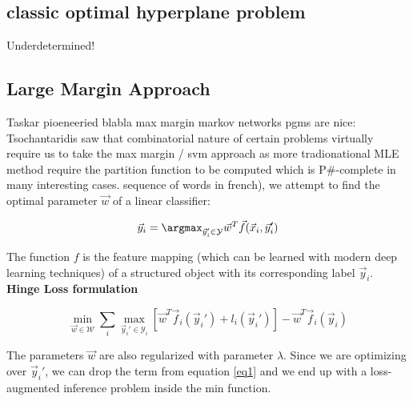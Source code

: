 \subsection{classic optimal hyperplane problem}
Underdetermined!



\clearpage
\subsection{Large Margin Approach}
Taskar pioeneeried blabla max margin markov networks pgms are nice: \cite{taskarMaxMarginMarkovNetworks2004}
Tsochantaridis saw that combinatorial nature of certain problems virtually
require us to take the max margin / svm approach as more tradionational MLE
method require the partition function to be computed which is P\#-complete in
many interesting cases.\cite{tsochantaridisSupportVectorMachine}
 sequence of words in
french), we attempt to find the optimal parameter $\vec w$ of a linear classifier:

\begin{equation}
  \vec y_i = \argmax_{\vec y_i' \in \mathcal{Y}} \vec w^T \vec f(\vec x_i,\vec y_i')
  \label{eq1}
\end{equation}

The function $f$ is the feature mapping (which can be learned with modern deep
learning techniques) of a structured object with its
corresponding label $\vec y_i$. \textbf{Hinge Loss formulation}

\begin{equation}
  \min_{\vec w \in \mathcal{W}} \sum_i \max_{\vec y_i' \in \mathcal{Y}_i} \left[
\vec w^T \vec f_i(\vec y_i') + l_i(\vec y_i') \right] - \vec w^T \vec f_i(\vec
y_i)
\end{equation}

The parameters $\vec w$ are also regularized with parameter $\lambda$. Since we are
optimizing over $\vec y_i'$, we can drop the term from equation \ref{eq1} and we end
up with a loss-augmented inference problem inside the min function.




